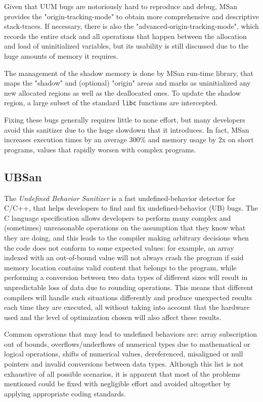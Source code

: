 Given that UUM bugs are notoriously hard to reproduce and debug, MSan provides the "origin-tracking-mode" to obtain more comprehensive and descriptive stack-traces. If necessary, there is also the "advanced-origin-tracking-mode", which records the entire stack and all operations that happen between the allocation and load of uninitialized variables, but its usability is still discussed due to the huge amounts of memory it requires.

The management of the shadow memory is done by MSan run-time library, that maps the "shadow" and (optional) "origin" areas and marks as uninitialized any new allocated regions as well as the deallocated ones. To update the shadow region, a large subset of the standard \verb|libc| functions are intercepted.

Fixing these bugs generally requires little to none effort, but many developers avoid this sanitizer due to the huge slowdown that it introduces. In fact, MSan increases execution times by an average 300\% and memory usage by 2x on short programs, values that rapidly worsen with complex programs. \cite{stepanov2015memorysanitizer}





\subsection{UBSan}
The \textit{Undefined Behavior Sanitizer} \cite{ubsan_docs} is a fast undefined-behavior detector for C/C++, that helps developers to find and fix undefined-behavior (UB) bugs. The C language specification allows developers to perform many complex and (sometimes) unreasonable operations on the assumption that they know what they are doing, and this leads to the compiler making arbitrary decisions when the code does not conform to some expected values: for example, an array indexed with an out-of-bound value will not always crash the program if said memory location contains valid content that belongs to the program, while performing a conversion between two data types of different sizes will result in unpredictable loss of data due to rounding operations. This means that different compilers will handle such situations differently and produce unexpected results each time they are executed, all without taking into account that the hardware used and the level of optimization chosen will also affect these results.

Common operations that may lead to undefined behaviors are: array subscription out of bounds, overflows/underflows of numerical types due to mathematical or logical operations, shifts of numerical values, dereferenced, misaligned or null pointers and invalid conversions between data types. Although this list is not exhaustive of all possible scenarios, it is apparent that most of the problems mentioned could be fixed with negligible effort and avoided altogether by applying appropriate coding standards.  

